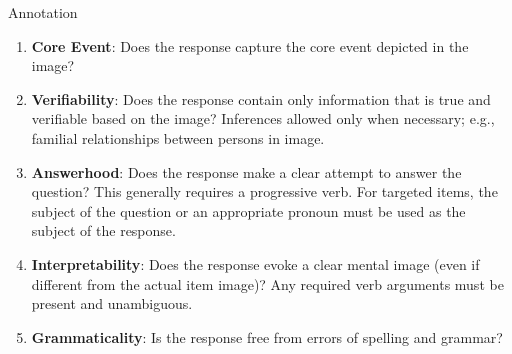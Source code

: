 \documentclass[final,t]{beamer}
\begin{document}
\begin{frame}{}
\begin{columns}[t]
\begin{column}{.33\linewidth}
\begin{block}{Annotation}
\begin{center}
\begin{minipage}{.85\textwidth}
\begin{enumerate}
\item \textbf{Core Event}: Does the response capture the core event depicted in the image?
\item \textbf{Verifiability}: Does the response contain only information that is true and verifiable based on the image? Inferences allowed only when necessary; e.g., familial relationships between persons in image. 
\item \textbf{Answerhood}: Does the response make a clear attempt to answer the question? This generally requires a progressive verb. For targeted items, the subject of the question or an appropriate pronoun must be used as the subject of the response.
\item \textbf{Interpretability}: Does the response evoke a clear mental image (even if different from the actual item image)? Any required verb arguments must be present and unambiguous.
\item \textbf{Grammaticality}: Is the response free from errors of spelling and grammar?  

\end{enumerate}


\end{minipage}
\end{center}
\end{block}
\end{column}
\end{columns}
\end{frame}
\end{document}
